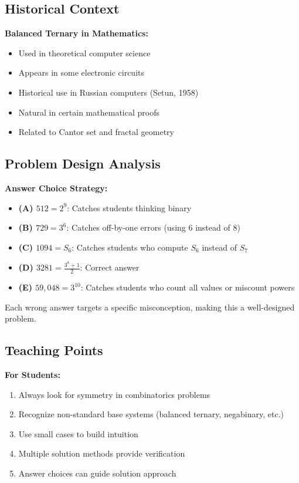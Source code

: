 \documentclass[12pt]{article}
\begin{document}
\subsection*{Historical Context}

\textbf{Balanced Ternary in Mathematics:}
\begin{itemize}
    \item Used in theoretical computer science
    \item Appears in some electronic circuits
    \item Historical use in Russian computers (Setun, 1958)
    \item Natural in certain mathematical proofs
    \item Related to Cantor set and fractal geometry
\end{itemize}

\subsection*{Problem Design Analysis}

\textbf{Answer Choice Strategy:}
\begin{itemize}
    \item \textbf{(A) $512 = 2^9$}: Catches students thinking binary
    \item \textbf{(B) $729 = 3^6$}: Catches off-by-one errors (using 6 instead of 8)
    \item \textbf{(C) $1094 = S_6$}: Catches students who compute $S_6$ instead of $S_7$
    \item \textbf{(D) $3281 = \frac{3^8+1}{2}$}: Correct answer
    \item \textbf{(E) $59,048 = 3^{10}$}: Catches students who count all values or miscount powers
\end{itemize}

Each wrong answer targets a specific misconception, making this a well-designed problem.

\subsection*{Teaching Points}

\textbf{For Students:}
\begin{enumerate}
    \item Always look for symmetry in combinatorics problems
    \item Recognize non-standard base systems (balanced ternary, negabinary, etc.)
    \item Use small cases to build intuition
    \item Multiple solution methods provide verification
    \item Answer choices can guide solution approach
\end{enumerate}
\end{document}
